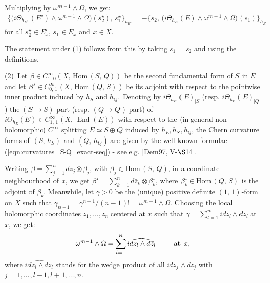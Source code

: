 \documentclass[12pt]{article}
\begin{document}
Multiplying by $\omega^{m-1}\wedge\Omega$, we get: \begin{eqnarray*}\label{eqn:Chern-curvatures_E-E-star_bis}\bigg\{\bigg(i\Theta_{h_{E^\star}}(E^\star)\wedge\omega^{m-1}\wedge\Omega\bigg)(s_2^\star),\, s_1^\star\bigg\}_{h_{E^\star}} = - \bigg\{s_2,\, \bigg(i\Theta_{h_E}(E)\wedge\omega^{m-1}\wedge\Omega\bigg)(s_1)\bigg\}_{h_E}\end{eqnarray*} for all $s_2^\star\in E^\star_x$, $s_1\in E_x$ and $x\in X$.

The statement under (1) follows from this by taking $s_1=s_2$ and using the definitions.

\vspace{1ex}

(2)\, Let $\beta\in C^\infty_{1,\,0}(X,\,\mbox{Hom}\,(S,\,Q))$ be the second fundamental form of $S$ in $E$ and let $\beta^\star\in C^\infty_{0,\,1}(X,\,\mbox{Hom}\,(Q,\,S))$ be its adjoint with respect to the pointwise inner product induced by $h_S$ and $h_Q$. Denoting by $i\Theta_{h_E}(E)_{|S}$ (resp. $i\Theta_{h_E}(E)_{|Q}$) the $(S\to S)$-part (resp. $(Q\to Q)$-part) of $i\Theta_{h_E}(E)\in C^\infty_{1,\,1}(X,\,\operatorname{End}  (E))$ with respect to the (in general non-holomorphic) $C^\infty$ splitting $E\simeq S\oplus Q$ induced by $h_E, h_S, h_Q$, the Chern curvature forms of $(S,\,h_S)$ and $(Q,\,h_Q)$ are given by the well-known formulae (\ref{eqn:curvatures_S-Q_exact-seq}) - see e.g. [Dem97, V-$\S14$].

Writing $\beta = \sum\limits_{j=1}^n dz_j\otimes\beta_j$, with $\beta_j\in\mbox{Hom}\,(S,\,Q)$, in a coordinate neighbourhood of $x$, we get $\beta^\star = \sum\limits_{k=1}^n d\bar{z}_k\otimes\beta_k^\star$, where $\beta_k^\star\in\mbox{Hom}\,(Q,\,S)$ is the adjoint of $\beta_k$. Meanwhile, let $\gamma>0$ be the (unique) positive definite $(1,\,1)$-form on $X$ such that $\gamma_{n-1} = \gamma^{n-1}/(n-1)! = \omega^{m-1}\wedge\Omega$. Choosing the local holomorphic coordinates $z_1,\dots , z_n$ centered at $x$ such that $\gamma = \sum_{l=1}^n idz_l\wedge d\bar{z}_l$ at $x$, we get: \begin{eqnarray*}\omega^{m-1}\wedge\Omega = \sum\limits_{l=1}^n \widehat{idz_l\wedge d\bar{z}_l}    \hspace{6ex} \mbox{at} \hspace{1ex} x,\end{eqnarray*} where $\widehat{idz_l\wedge d\bar{z}_l}$ stands for the wedge product of all $idz_j\wedge d\bar{z}_j$ with $j = 1, \dots , l-1, l+1,\dots , n$.
\end{document}
